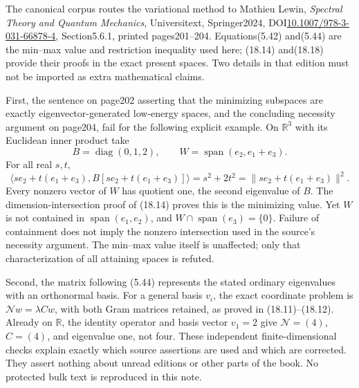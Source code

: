 \documentclass[
]{article}
\begin{document}
The canonical corpus routes the variational method to Mathieu Lewin,
\emph{Spectral Theory and Quantum Mechanics}, Universitext,
Springer2024,
DOI\href{https://doi.org/10.1007/978-3-031-66878-4}{10.1007/978-3-031-66878-4},
Section5.6.1, printed pages201--204. Equations(5.42) and(5.44) are the
min--max value and restriction inequality used here; (18.14) and(18.18)
provide their proofs in the exact present spaces. Two details in that
edition must not be imported as extra mathematical claims.

First, the sentence on page202 asserting that the minimizing subspaces
are exactly eigenvector-generated low-energy spaces, and the concluding
necessity argument on page204, fail for the following explicit example.
On \(\mathbb R^3\) with its Euclidean inner product take \[
B=\operatorname{diag}(0,1,2),\qquad
W=\operatorname{span}(e_2,e_1+e_3).
\] For all real \(s,t\), \[
\langle se_2+t(e_1+e_3),B[se_2+t(e_1+e_3)]\rangle
 =s^2+2t^2=\|se_2+t(e_1+e_3)\|^2.                           \tag{18.19}
\] Every nonzero vector of \(W\) has quotient one, the second eigenvalue
of \(B\). The dimension-intersection proof of (18.14) proves this is the
minimizing value. Yet \(W\) is not contained in
\(\operatorname{span}(e_1,e_2)\), and
\(W\cap\operatorname{span}(e_3)=\{0\}\). Failure of containment does not
imply the nonzero intersection used in the source's necessity argument.
The min--max value itself is unaffected; only that characterization of
all attaining spaces is refuted.

Second, the matrix following (5.44) represents the stated ordinary
eigenvalues with an orthonormal basis. For a general basis \(v_i\), the
exact coordinate problem is \(\mathcal Nw=\lambda Cw\), with both Gram
matrices retained, as proved in (18.11)--(18.12). Already on
\(\mathbb R\), the identity operator and basis vector \(v_1=2\) give
\(\mathcal N=(4)\), \(C=(4)\), and eigenvalue one, not four. These
independent finite-dimensional checks explain exactly which source
assertions are used and which are corrected. They assert nothing about
unread editions or other parts of the book. No protected bulk text is
reproduced in this note.
\end{document}
